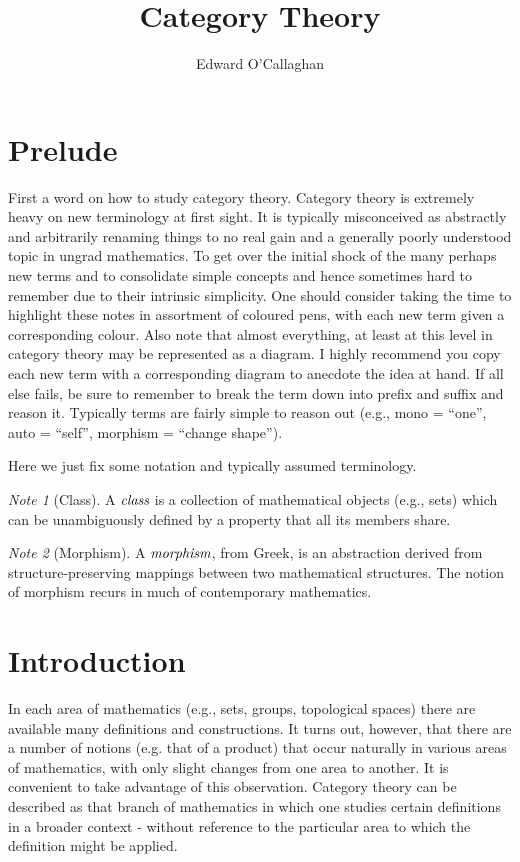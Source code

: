 \documentclass[10pt, oneside, reqno]{amsart}
\title{Category Theory}                               %
\author{Edward O'Callaghan}
\theoremstyle{plain}%
\theoremstyle{definition}
\theoremstyle{remark}
\newtheorem*{note}{Note}
\begin{document}
\maketitle \tableofcontents \clearpage

\section{Prelude} %
\label{sec:purelude}
First a word on how to study category theory. Category theory is extremely heavy on new terminology at first sight.
It is typically misconceived as abstractly and arbitrarily renaming things to no real gain and a generally poorly understood
topic in ungrad mathematics. To get over the initial shock of the many perhaps new terms and to consolidate simple concepts
and hence sometimes hard to remember due to their intrinsic simplicity. One should consider taking the time to highlight these
notes in assortment of coloured pens, with each new term given a corresponding colour. Also note that almost everything, at least
at this level in category theory may be represented as a diagram. I highly recommend you copy each new term with a corresponding
diagram to anecdote the idea at hand. If all else fails, be sure to remember to break the term down into prefix and suffix and reason
it. Typically terms are fairly simple to reason out (e.g., mono = ``one'', auto = ``self'', morphism = ``change shape'').

Here we just fix some notation and typically assumed terminology.
\begin{note}[Class]
 A $\emph{class}$ is a collection of mathematical objects (e.g., sets)
 which can be unambiguously defined by a property that all its members share.
\end{note}

\begin{note}[Morphism]
 A $\emph{morphism}$, from Greek, is an abstraction derived from
 structure-preserving mappings between two mathematical structures.
 The notion of morphism recurs in much of contemporary mathematics.
\end{note}


\section{Introduction} %
\label{sec:introduction}
In each area of mathematics (e.g., sets, groups, topological spaces) there are available many definitions
and constructions. It turns out, however, that there are a number of notions (e.g. that of a product)
that occur naturally in various areas of mathematics, with only slight changes from one area to another.
It is convenient to take advantage of this observation. Category theory can be described as that branch of mathematics
in which one studies certain definitions in a broader context - without reference to the particular area to which
the definition might be applied.
\end{document}
